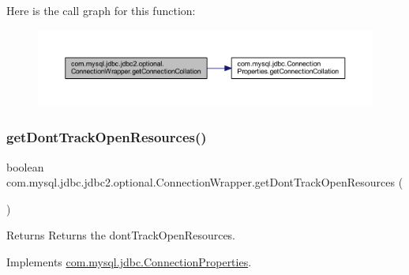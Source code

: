 Here is the call graph for this function\+:
\nopagebreak
\begin{figure}[H]
\begin{center}
\leavevmode
\includegraphics[width=350pt]{classcom_1_1mysql_1_1jdbc_1_1jdbc2_1_1optional_1_1_connection_wrapper_a84565674abf2610e671950412a2c8be7_cgraph}
\end{center}
\end{figure}
\mbox{\label{classcom_1_1mysql_1_1jdbc_1_1jdbc2_1_1optional_1_1_connection_wrapper_a8d9246e6e3a72c4ecfeca155225eafa9}} 
\subsubsection{\texorpdfstring{get\+Dont\+Track\+Open\+Resources()}{getDontTrackOpenResources()}}
{\footnotesize\ttfamily boolean com.\+mysql.\+jdbc.\+jdbc2.\+optional.\+Connection\+Wrapper.\+get\+Dont\+Track\+Open\+Resources (\begin{DoxyParamCaption}{ }\end{DoxyParamCaption})}

\begin{DoxyReturn}{Returns}
Returns the dont\+Track\+Open\+Resources. 
\end{DoxyReturn}


Implements \mbox{\hyperlink{interfacecom_1_1mysql_1_1jdbc_1_1_connection_properties_aec0f6158d9bacdc45d430fbddcc93120}{com.\+mysql.\+jdbc.\+Connection\+Properties}}.

